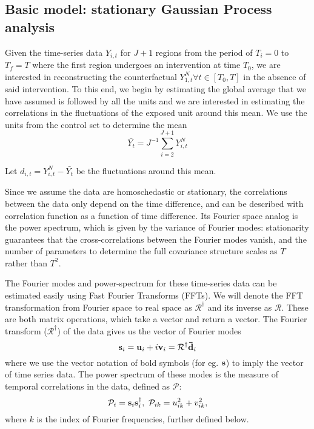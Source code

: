 \documentclass{article}
\def\bv{{\bf v}}
\def\bu{{\bf u}}
\def\bs{{\bf s}}
\def\bdb{{\bf \bar d}}
\def\mR{\mathcal{R}}
\newcommand\US[1]{\textcolor{red}{(US: #1)}}
\begin{document}
\subsection{Basic model: stationary Gaussian Process analysis}
\label{sec:prior}

Given the time-series data $Y_{i, t}$ for $J+1$ regions from the period of $T_i=0$ to $T_f=T$ where the first region undergoes an intervention at time $T_0$, we are interested in reconstructing the counterfactual $Y^N_{1, t} \forall t\in[T_0, T]$ in the absence of said intervention. To this end, we begin by estimating the global average that we have assumed is followed by all the units and we are interested in estimating the correlations in the fluctuations of the exposed unit around this mean. We use the units from the control set to determine the mean
\begin{equation}
    \bar{Y_t} = J^{-1}\sum_{i=2}^{J+1} Y^N_{i,t} 
\end{equation}{}

Let $d_{i, t} = Y^N_{i,t} - \bar{Y_t}$ be the fluctuations around this mean. 


Since we assume the data are homoschedastic or stationary, 
the correlations between the data only depend on the time 
difference, and can be described with correlation function 
as a function of time difference. Its Fourier space 
analog is the power spectrum, which is given by the 
variance of Fourier modes: stationarity guarantees that 
the cross-correlations between the Fourier modes vanish, 
and the number of parameters to determine the full 
covariance structure scales as $T$ rather than $T^2$. 

The Fourier modes and power-spectrum for these time-series data can be estimated easily using Fast Fourier Transforms (FFTs). 
We will denote the FFT transformation from 
Fourier space to real space as $\mR^\dagger$ and its inverse 
as $\mR$. These are both matrix operations, which take a 
vector and return a vector. 
The Fourier transform ($\mathcal{R}^\dagger$) of the data gives us the vector of Fourier modes
\begin{equation}
    \bs_i =  \bu_i+i\bv_i = \mR^\dagger\bdb_i
\end{equation}
where we use the vector notation of bold symbols (for eg. $\bs$) to imply the vector of time series data. The power spectrum of these modes is the measure of temporal correlations in the data, 
defined as $\mathcal{P}$:
\begin{equation}
    \mathcal{P}_i = \bs_i \bs_i^\dagger, \,\, \mathcal{P}_{ik}=u_{ik}^2+v_{ik}^2, 
\end{equation}
where $k$ is the index of Fourier frequencies, further defined below.  
\end{document}
